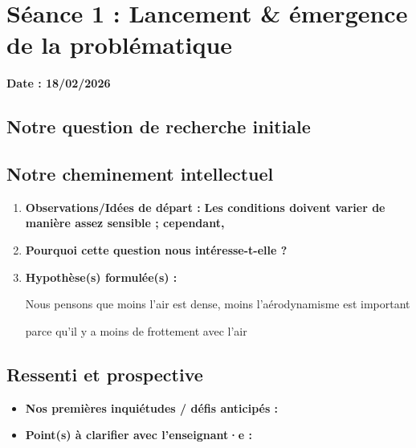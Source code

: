\documentclass[11pt, a4paper]{article}
\begin{document}
\section{Séance 1 : Lancement \& émergence de la problématique}

\medskip

\textbf{Date : 18/02/2026}

\medskip

\subsection{Notre question de recherche initiale}
\noindent
{}

\subsection{Notre cheminement intellectuel}
\begin{enumerate}
    \item \textbf{Observations/Idées de départ : }
    \textbf{ Les conditions doivent varier de manière assez sensible ; cependant,} 
    
    \bigskip
    
    \item \textbf{Pourquoi cette question nous intéresse-t-elle ?} 
    
    \bigskip
    
    \item \textbf{Hypothèse(s) formulée(s) :} 
    
    Nous pensons que moins l'air est dense, moins l'aérodynamisme est important 

    \medskip
    
    parce qu'il y a moins de frottement avec l'air

    \bigskip
    

\end{enumerate}

\subsection{Ressenti et prospective}
\begin{itemize}
    \item[$\bullet$] \textbf{Nos premières inquiétudes / défis anticipés :}
    \item[$\bullet$] \textbf{Point(s) à clarifier avec l'enseignant·e :}
\end{itemize}
\end{document}
